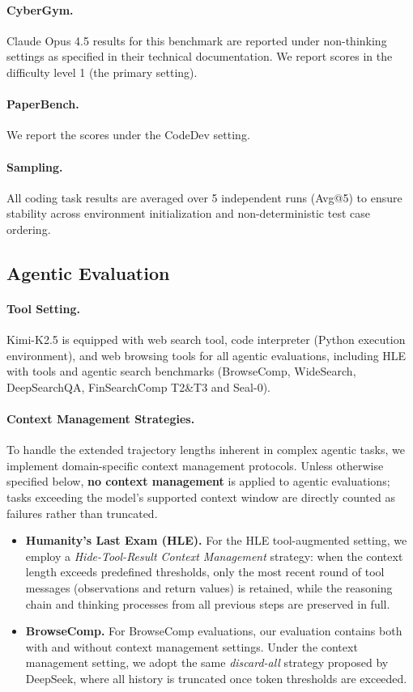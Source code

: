 \paragraph{CyberGym.} Claude Opus 4.5 results for this benchmark are reported under non-thinking settings as specified in their technical documentation. We report scores in the difficulty level 1 (the primary setting).

\paragraph{PaperBench.} We report the scores under the CodeDev setting.

\paragraph{Sampling.} All coding task results are averaged over 5 independent runs (Avg@5) to ensure stability across environment initialization and non-deterministic test case ordering.

\subsection{Agentic Evaluation}
\label{app:eval_agentic}

\paragraph{Tool Setting.} Kimi-K2.5 is equipped with web search tool, code interpreter (Python execution environment), and web browsing tools for all agentic evaluations, including HLE with tools and agentic search benchmarks (BrowseComp, WideSearch, DeepSearchQA, FinSearchComp T2\&T3 and Seal-0).

\paragraph{Context Management Strategies.} 
To handle the extended trajectory lengths inherent in complex agentic tasks, we implement domain-specific context management protocols. Unless otherwise specified below, \textbf{no context management} is applied to agentic evaluations; tasks exceeding the model's supported context window are directly counted as failures rather than truncated.

\begin{itemize}
    \item \textbf{Humanity's Last Exam (HLE).} For the HLE tool-augmented setting, we employ a \textit{Hide-Tool-Result Context Management} strategy: when the context length exceeds predefined thresholds, only the most recent round of tool messages (observations and return values) is retained, while the reasoning chain and thinking processes from all previous steps are preserved in full.
    
    \item \textbf{BrowseComp.} For BrowseComp evaluations, our evaluation contains both with and without context management settings. Under the context management setting, we adopt the same \textit{discard-all} strategy proposed by DeepSeek, where all history is truncated once token thresholds are exceeded.
\end{itemize}
